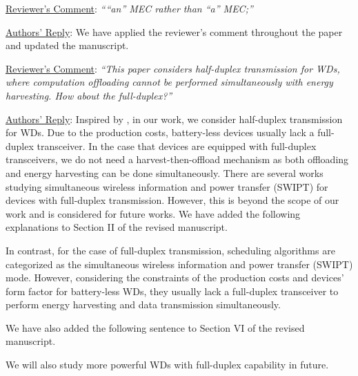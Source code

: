 \documentclass[12pt,draftclsnofoot,onecolumn]{IEEEtran}
\newcommand{\rev}[1]{{\color{blue}#1}} %
\newcommand{\rev}[1]{#1}
\newenvironment{my}[2]%
{\begin{list}{}%
{\setlength{\rightmargin}{#1}\setlength{\leftmargin}{#2}}%


 \item[]{}

} {\end{list}}
\begin{document}
\begin{enumerate}
	
	
	\item \underline{Reviewer's Comment}: \textit{````an'' MEC rather than ``a'' MEC;''} \newline
	
	\underline{Authors' Reply}: We have applied the reviewer's comment throughout the paper and updated the manuscript.\\
	
	\item \underline{Reviewer's Comment}: \textit{``This paper considers half-duplex transmission for WDs, where computation offloading cannot be performed simultaneously with energy harvesting. How about the full-duplex?''} \newline
	
	\underline{Authors' Reply}: Inspired by \cite{b2,b10,b11,b14}, in our work, we consider half-duplex transmission for WDs. Due to the production costs, battery-less devices usually lack a full-duplex transceiver. In the case that devices are equipped with full-duplex transceivers, we do not need a harvest-then-offload mechanism as both offloading and energy harvesting can be done simultaneously. There are several works studying simultaneous wireless information and power transfer (SWIPT) \cite{b8} for devices with full-duplex transmission. However, this is beyond the scope of our work and is considered for future works. We have added the following explanations to Section II of the revised manuscript. \newline
		
	\begin{my}{1cm}{1cm}
		\rev{
			In contrast, for the case of full-duplex transmission, scheduling algorithms are categorized as the simultaneous wireless information and power transfer (SWIPT) \cite{b8} mode. However, considering the constraints of the production costs and devices' form factor for battery-less WDs, they usually lack a full-duplex transceiver to perform energy harvesting and data transmission simultaneously.
		}\newline
	\end{my}
	
	We have also added the following sentence to Section VI of the revised manuscript.

	\begin{my}{1cm}{1cm}
		\rev{
				We will also study more powerful WDs with full-duplex capability in future.
		}\newline
	\end{my}
	

\end{enumerate}
\end{document}
